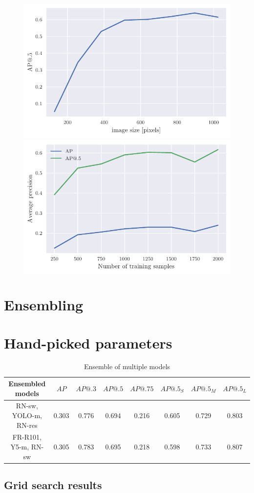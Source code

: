 \begin{figure}
    \begin{floatrow}[2]
        \includegraphics[width=0.5\linewidth]{images/img_size_dependency.pdf}\qquad
        \includegraphics[width=0.5\linewidth]{images/training_set_dependency.pdf}\qquad
    \end{floatrow}
\end{figure}

\section{Ensembling}
\section{Hand-picked parameters}
\begin{table}[h]
    \begin{tabular}{|c|c|c|c|c|c|c|c|}
        \hline
        Ensembled models      & $AP$  & $AP@.3$ & $AP@.5$ & $AP@.75$ & $AP@.5_S$ & $AP@.5_M$ & $AP@.5_L$ \\ \hline
        RN-sw, YOLO-m, RN-res & 0.303 & 0.776   & 0.694   & 0.216    & 0.605     & 0.729     & 0.803     \\ \hline
        FR-R101, Y5-m, RN-sw  & 0.305 & 0.783   & 0.695   & 0.218    & 0.598     & 0.733     & 0.807     \\ \hline
    \end{tabular}
    \caption{Ensemble of multiple models}
    \label{tab:model_ensembling}
\end{table}
\subsection{Grid search results}

